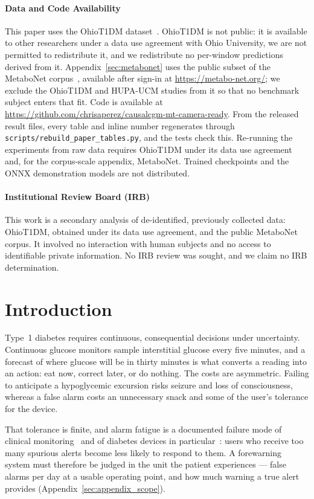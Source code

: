 \documentclass[pmlr,twocolumn,10pt]{jmlr}
\begin{document}
\paragraph*{Data and Code Availability}
This paper uses the OhioT1DM dataset~\citep{marling2020ohiot1dm}. OhioT1DM is
not public: it is available to other researchers under a data use agreement
with Ohio University, we are not permitted to redistribute it, and we
redistribute no per-window predictions derived from it.
Appendix~\ref{sec:metabonet} uses the public subset of the MetaboNet
corpus~\citep{wolff2026metabonet}, available after sign-in at
\url{https://metabo-net.org/}; we exclude the OhioT1DM and HUPA-UCM studies
from it so that no benchmark subject enters that fit. Code is available at
\url{https://github.com/chrisaperez/causalcgm-mt-camera-ready}. From the
released result files, every table and inline number regenerates through
\texttt{scripts/rebuild\_paper\_tables.py}, and the tests check this.
Re-running the experiments from raw data requires OhioT1DM under its data use
agreement and, for the corpus-scale appendix, MetaboNet. Trained checkpoints
and the ONNX demonstration models are not distributed.

\paragraph*{Institutional Review Board (IRB)}
This work is a secondary analysis of de-identified, previously collected data:
OhioT1DM, obtained under its data use agreement, and the public MetaboNet
corpus. It involved no interaction with human subjects and no access to
identifiable private information. No IRB review was sought, and we claim no IRB
determination.

\section{Introduction}

Type~1 diabetes requires continuous, consequential decisions under uncertainty.
Continuous glucose monitors sample interstitial glucose every five minutes, and
a forecast of where glucose will be in thirty minutes is what converts a reading
into an action: eat now, correct later, or do nothing. The costs are asymmetric.
Failing to anticipate a hypoglycemic excursion risks seizure and loss of
consciousness, whereas a false alarm costs an unnecessary snack and some of the
user's tolerance for the device.

That tolerance is finite, and alarm fatigue is a documented failure mode of
clinical monitoring~\citep{cvach2012monitor} and of diabetes devices in
particular~\citep{shivers2013turn}: users who receive too many spurious alerts
become less likely to respond to them. A
forewarning system must therefore be judged in the unit the patient experiences
--- false alarms per day at a usable operating point, and how much warning a
true alert provides (Appendix~\ref{sec:appendix_scope}).
\end{document}
